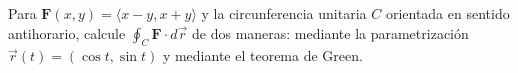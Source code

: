 Para $\mathbf{F}(x,y)=\langle x-y,x+y\rangle$ y la circunferencia unitaria $C$ orientada en sentido antihorario, calcule $\oint_C\mathbf{F}\cdot d\vec r$ de dos maneras: mediante la parametrización $\vec r(t)=(\cos t,\sin t)$ y mediante el teorema de Green.

